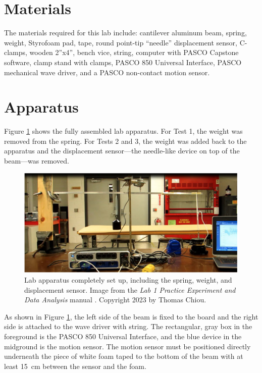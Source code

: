 \documentclass[12 pt]{report}
\begin{document}
\section{Materials} \label{materials}
The materials required for this lab include: cantilever aluminum beam, spring, weight, Styrofoam pad, tape, round point-tip ``needle'' displacement sensor, C-clamps, wooden 2''x4'', bench vice, string, computer with PASCO Capstone software, clamp stand with clamps, PASCO 850 Universal Interface, PASCO mechanical wave driver, and a PASCO non-contact motion sensor.

\section{Apparatus} \label{apparatus}
Figure \ref{fig:lab_apparatus} shows the fully assembled lab apparatus. For Test 1, the weight was removed from the spring. For Tests 2 and 3, the weight was added back to the apparatus and the displacement sensor---the needle-like device on top of the beam---was removed.

\begin{figure}[ht]
\centering
\includegraphics[width=6in]{images/Lab_Apparatus}
\caption{Lab apparatus completely set up, including the spring, weight, and displacement sensor. Image from the \textit{Lab 1 Practice Experiment and Data Analysis} manual \cite{lab_procedures}. Copyright 2023 by Thomas Chiou.}
\label{fig:lab_apparatus}
\end{figure}

As shown in Figure \ref{fig:lab_apparatus}, the left side of the beam is fixed to the board and the right side is attached to the wave driver with string. The rectangular, gray box in the foreground is the PASCO 850 Universal Interface, and the blue device in the midground is the motion sensor. The motion sensor must be positioned directly underneath the piece of white foam taped to the bottom of the beam with at least \qty{15}{cm} between the sensor and the foam.
\end{document}
